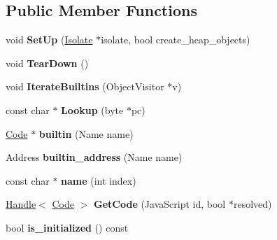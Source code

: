 \subsection*{Public Member Functions}
\begin{DoxyCompactItemize}
\item 
\hypertarget{classv8_1_1internal_1_1_builtins_a75e1d9f48247554cfe5523c1daf71371}{}void {\bfseries Set\+Up} (\hyperlink{classv8_1_1internal_1_1_isolate}{Isolate} $\ast$isolate, bool create\+\_\+heap\+\_\+objects)\label{classv8_1_1internal_1_1_builtins_a75e1d9f48247554cfe5523c1daf71371}

\item 
\hypertarget{classv8_1_1internal_1_1_builtins_a0dd5f6b191e420297c6e6cfa801df51e}{}void {\bfseries Tear\+Down} ()\label{classv8_1_1internal_1_1_builtins_a0dd5f6b191e420297c6e6cfa801df51e}

\item 
\hypertarget{classv8_1_1internal_1_1_builtins_a0da2dcc2e4d1c551beef7576b1f7f5c5}{}void {\bfseries Iterate\+Builtins} (Object\+Visitor $\ast$v)\label{classv8_1_1internal_1_1_builtins_a0da2dcc2e4d1c551beef7576b1f7f5c5}

\item 
\hypertarget{classv8_1_1internal_1_1_builtins_a22c3b1cfab8e834234d728c03e332e26}{}const char $\ast$ {\bfseries Lookup} (byte $\ast$pc)\label{classv8_1_1internal_1_1_builtins_a22c3b1cfab8e834234d728c03e332e26}

\item 
\hypertarget{classv8_1_1internal_1_1_builtins_a7c2862becc6cf484e05195a4f180b04f}{}\hyperlink{classv8_1_1internal_1_1_code}{Code} $\ast$ {\bfseries builtin} (Name name)\label{classv8_1_1internal_1_1_builtins_a7c2862becc6cf484e05195a4f180b04f}

\item 
\hypertarget{classv8_1_1internal_1_1_builtins_a7f2c4c5fa584b481598b346f42ac9a7e}{}Address {\bfseries builtin\+\_\+address} (Name name)\label{classv8_1_1internal_1_1_builtins_a7f2c4c5fa584b481598b346f42ac9a7e}

\item 
\hypertarget{classv8_1_1internal_1_1_builtins_a91b89e9e3abd524b033e20105c67243a}{}const char $\ast$ {\bfseries name} (int index)\label{classv8_1_1internal_1_1_builtins_a91b89e9e3abd524b033e20105c67243a}

\item 
\hypertarget{classv8_1_1internal_1_1_builtins_a165fd1f5b1cb27a378fe333f0ba485bf}{}\hyperlink{classv8_1_1internal_1_1_handle}{Handle}$<$ \hyperlink{classv8_1_1internal_1_1_code}{Code} $>$ {\bfseries Get\+Code} (Java\+Script id, bool $\ast$resolved)\label{classv8_1_1internal_1_1_builtins_a165fd1f5b1cb27a378fe333f0ba485bf}

\item 
\hypertarget{classv8_1_1internal_1_1_builtins_a764c94df78f2579f0afc3023a8a4bf2f}{}bool {\bfseries is\+\_\+initialized} () const \label{classv8_1_1internal_1_1_builtins_a764c94df78f2579f0afc3023a8a4bf2f}

\end{DoxyCompactItemize}
